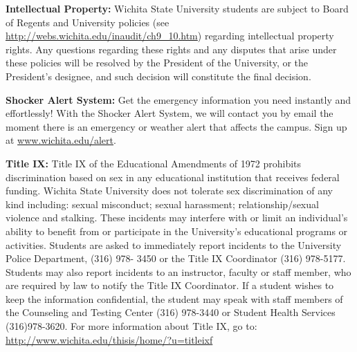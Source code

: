 \documentclass[11pt, a4paper]{article}
\begin{document}
\vspace*{.15in}
\noindent\textbf{Intellectual Property:}
Wichita State University students are subject to Board of Regents and University policies (see \url{http://webs.wichita.edu/inaudit/ch9_10.htm}) regarding intellectual property rights. Any questions regarding these rights and any disputes that arise under these policies will be resolved by the President of the University, or the President’s designee, and such decision will constitute the final decision.

\vspace*{.15in}
\noindent\textbf{Shocker Alert System:}
Get the emergency information you need instantly and effortlessly! With the Shocker Alert System, we will contact you by email the moment there is an emergency or weather alert that affects the campus.  Sign up at \url{www.wichita.edu/alert}.

\vspace*{.15in}
\noindent\textbf{Title IX:}
Title IX of the Educational Amendments of 1972 prohibits discrimination based on sex in any educational institution that receives federal funding. Wichita State University does not tolerate sex discrimination of any kind including: sexual misconduct; sexual harassment; relationship/sexual violence and stalking.  These incidents may interfere with or limit an individual’s ability to benefit from or participate in the University’s educational programs or activities. Students are asked to immediately report incidents to the University Police Department, (316) 978- 3450 or the Title IX Coordinator (316) 978-5177. Students may also report incidents to an instructor, faculty or staff member, who are required by law to notify the Title IX Coordinator. If a student wishes to keep the information confidential, the student may speak with staff members of the Counseling and Testing Center (316) 978-3440 or Student Health Services (316)978-3620. For more information about Title IX, go to: \url{http://www.wichita.edu/thisis/home/?u=titleixf}

\end{document}
